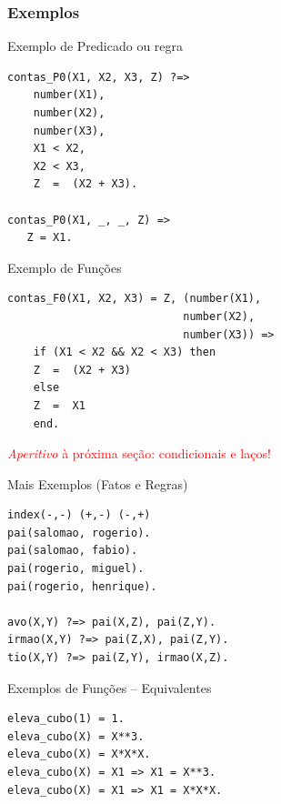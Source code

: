 \begin{frame}[fragile]

\frametitle{Exemplos}

\begin{block}{Exemplo de Predicado ou regra}
   
\begin{lstlisting}[frame=single]
contas_P0(X1, X2, X3, Z) ?=>
    number(X1),
    number(X2),
    number(X3),
    X1 < X2,
    X2 < X3,
    Z  =  (X2 + X3).
    
contas_P0(X1, _, _, Z) =>
   Z = X1.    
\end{lstlisting}
    \end{block}

        
\end{frame}

\begin{frame}[fragile]

\begin{block}{Exemplo de Funções}
     
\begin{lstlisting}[frame=single]
contas_F0(X1, X2, X3) = Z, (number(X1), 
                           number(X2), 
                           number(X3)) =>
    if (X1 < X2 && X2 < X3) then
    Z  =  (X2 + X3)
    else
    Z  =  X1
    end.
\end{lstlisting}
        
 \end{block}

\textcolor{red}{\textit{Aperitivo} à próxima seção: condicionais e laços!}
    
\end{frame}    
\begin{frame}[fragile]
   
\begin{block}{Mais Exemplos (Fatos e Regras)}
    
\begin{lstlisting}[frame=single]
index(-,-) (+,-) (-,+)
pai(salomao, rogerio).
pai(salomao, fabio).
pai(rogerio, miguel).
pai(rogerio, henrique).

avo(X,Y) ?=> pai(X,Z), pai(Z,Y).
irmao(X,Y) ?=> pai(Z,X), pai(Z,Y).
tio(X,Y) ?=> pai(Z,Y), irmao(X,Z).
\end{lstlisting}
    
 \end{block}
    
\end{frame}    
\begin{frame}[fragile]
    
\begin{block}{Exemplos de Funções -- Equivalentes}
    
\begin{lstlisting}[frame=single]
eleva_cubo(1) = 1.
eleva_cubo(X) = X**3.
eleva_cubo(X) = X*X*X.
eleva_cubo(X) = X1 => X1 = X**3.
eleva_cubo(X) = X1 => X1 = X*X*X.
\end{lstlisting}
        
\end{block}
    
\end{frame}

